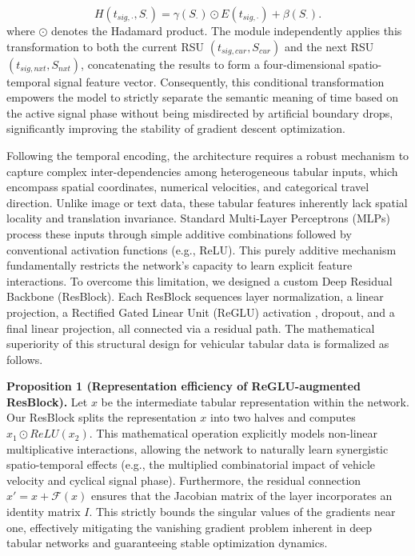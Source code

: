\documentclass[journal]{IEEEtran}
\begin{document}
\begin{equation}
    H(t_{sig,\cdot}, S_{\cdot})=\gamma(S_{\cdot}) \odot E(t_{sig,\cdot})+\beta(S_{\cdot}).
\end{equation}
where $\odot$ denotes the Hadamard product.
The module independently applies this transformation to both the current RSU $(t_{sig,cur}, S_{cur})$ and the next RSU $(t_{sig,nxt}, S_{nxt})$, concatenating the results to form a four-dimensional spatio-temporal signal feature vector.
Consequently, this conditional transformation empowers the model to strictly separate the semantic meaning of time based on the active signal phase without being misdirected by artificial boundary drops, significantly improving the stability of gradient descent optimization.

Following the temporal encoding, the architecture requires a robust mechanism to capture complex inter-dependencies among heterogeneous tabular inputs, which encompass spatial coordinates, numerical velocities, and categorical travel direction.
Unlike image or text data, these tabular features inherently lack spatial locality and translation invariance.
Standard Multi-Layer Perceptrons (MLPs) process these inputs through simple additive combinations followed by conventional activation functions (e.g., ReLU).
This purely additive mechanism fundamentally restricts the network's capacity to learn explicit feature interactions.
To overcome this limitation, we designed a custom Deep Residual Backbone (ResBlock).
Each ResBlock sequences layer normalization, a linear projection, a Rectified Gated Linear Unit (ReGLU) activation \cite{x1}, dropout, and a final linear projection, all connected via a residual path.
The mathematical superiority of this structural design for vehicular tabular data is formalized as follows.

\textbf{Proposition 1 (Representation efficiency of ReGLU-augmented ResBlock).}
Let $x$ be the intermediate tabular representation within the network.
Our ResBlock splits the representation $x$ into two halves and computes $x_{1}\odot ReLU(x_{2})$.
This mathematical operation explicitly models non-linear multiplicative interactions, allowing the network to naturally learn synergistic spatio-temporal effects (e.g., the multiplied combinatorial impact of vehicle velocity and cyclical signal phase).
Furthermore, the residual connection $x'=x+\mathcal{F}(x)$ ensures that the Jacobian matrix of the layer incorporates an identity matrix $I$.
This strictly bounds the singular values of the gradients near one, effectively mitigating the vanishing gradient problem inherent in deep tabular networks and guaranteeing stable optimization dynamics.
\end{document}
